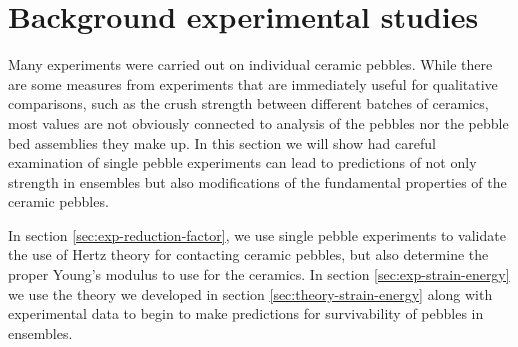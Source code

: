 \chapter{Background experimental studies}\label{sec:studies-experiments}

Many experiments were carried out on individual ceramic pebbles. While there are some measures from experiments that are immediately useful for qualitative comparisons, such as the crush strength between different batches of ceramics, most values are not obviously connected to analysis of the pebbles nor the pebble bed assemblies they make up. In this section we will show had careful examination of single pebble experiments can lead to predictions of not only strength in ensembles but also modifications of the fundamental properties of the ceramic pebbles.

In section \cref{sec:exp-reduction-factor}, we use single pebble experiments to validate the use of Hertz theory for contacting ceramic pebbles, but also determine the proper Young's modulus to use for the ceramics. In section \cref{sec:exp-strain-energy} we use the theory we developed in section \cref{sec:theory-strain-energy} along with experimental data to begin to make predictions for survivability of pebbles in ensembles.












